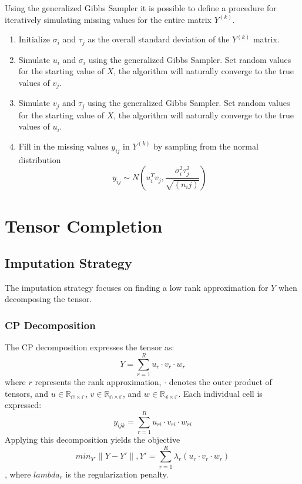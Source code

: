 \documentclass[12pt,twoside]{dukestatscithesis}
\providecommand{\tightlist}{%
  \setlength{\itemsep}{0pt}\setlength{\parskip}{0pt}}
\theoremstyle{definition}
\theoremstyle{definition}
\theoremstyle{definition}
\theoremstyle{remark}
\begin{document}
Using the generalized Gibbs Sampler it is possible to define a procedure
for iteratively simulating missing values for the entire matrix
\(Y^{(k)}\).
\begin{enumerate}
\def\labelenumi{\arabic{enumi}.}
\tightlist
\item
  Initialize \(\sigma_i\) and \(\tau_j\) as the overall standard
  deviation of the \(Y^{(k)}\) matrix.
\item
  Simulate \(u_i\) and \(\sigma_i\) using the generalized Gibbs Sampler.
  Set random values for the starting value of \(X\), the algorithm will
  naturally converge to the true values of \(v_j\).
\item
  Simulate \(v_j\) and \(\tau_j\) using the generalized Gibbs Sampler.
  Set random values for the starting value of \(X\), the algorithm will
  naturally converge to the true values of \(u_i\).
\item
  Fill in the missing values \(y_{ij}\) in \(Y^{(k)}\) by sampling from
  the normal distribution
  \[y_{ij} \sim N(u_i^Tv_j, \frac{\sigma_i^2\tau_j^2}{\sqrt{(n_ij)}})\]
\end{enumerate}
\chapter{Tensor Completion}\label{tensor-completion}

\section{Imputation Strategy}\label{imputation-strategy}

The imputation strategy focuses on finding a low rank approximation for
\(Y\) when decomposing the tensor.

\subsection{CP Decomposition}\label{cp-decomposition}

The CP decomposition expresses the tensor as:
\[Y = \sum_{r=1}^Ru_r \cdotp v_r \cdotp w_r\] where \(r\) represents the
rank approximation, \(\cdotp\) denotes the outer product of tensors, and
\(u \in \mathbb{R_{m \times r}}\), \(v \in \mathbb{R_{n \times r}}\),
and \(w \in \mathbb{R_{4 \times r}}\). Each individual cell is
expressed: \[y_{ijk} = \sum_{r=1}^Ru_{ri} \cdotp v_{ri} \cdotp w_{ri}\]
Applying this decomposition yields the objective
\[min_{Y'}\|Y-Y'\|, Y' = \sum_{r=1}^R\lambda_r(u_r \cdotp v_r \cdotp w_r)\],
where \(lambda_r\) is the regularization penalty.
\end{document}
